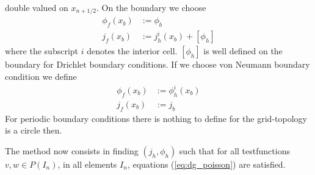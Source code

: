 \documentclass[a4paper,12pt]{scrartcl}
\begin{document}
double valued on $x_{n+1/2}$.
On the boundary we choose
\begin{subequations}
    \begin{align}
        \phi_f(x_b) &:= \phi_b \\
        j_f(x_b) &:= j_h^i(x_b) + [\phi_h]
        \label{ eq:dg_dirichlet_boundary_fluxes}
    \end{align}
\end{subequations}
where the subscript $i$ denotes the interior cell. $[\phi_h]$ is well
defined on the boundary for Drichlet boundary conditions. If we 
choose von Neumann boundary condition we define
\begin{subequations}
    \begin{align}
        \phi_f(x_b) &:= \phi^i_h(x_b) \\
        j_f(x_b) &:= j_b
        \label{eq:dg_neumann_boundary_fluxes}
    \end{align}
\end{subequations}
For periodic boundary conditions there is nothing to define for 
the grid-topology is a circle then. 

The method now consists in finding $(j_h, \phi_h)$ such that for all 
testfunctions $v, w\in P(I_n)$, in all elements $I_n$, equations 
(\ref{eq:dg_poisson}) are satisfied.
\end{document}
